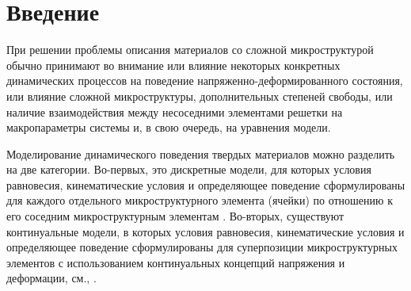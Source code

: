 	
\section{Введение}

При решении проблемы описания материалов со сложной микроструктурой обычно принимают во внимание или влияние некоторых конкретных динамических процессов на поведение напряженно-деформированного состояния, или влияние сложной микроструктуры, дополнительных степеней свободы, или наличие взаимодействия между несоседними элементами решетки на макропараметры системы и, в свою очередь, на уравнения модели.
	
Моделирование динамического поведения твердых материалов можно разделить на две категории. Во-первых, это дискретные модели, для которых условия равновесия, кинематические условия и определяющее поведение сформулированы для каждого отдельного микроструктурного элемента (ячейки) по отношению к его соседним микроструктурным элементам \cite{Born, AskMetr, Askar, Ostoja}. Во-вторых, существуют континуальные модели, в которых условия равновесия, кинематические условия и определяющее поведение сформулированы для суперпозиции микроструктурных элементов с использованием континуальных концепций напряжения и деформации, см., \cite{Maug, engbook97, erofeev}.
	
